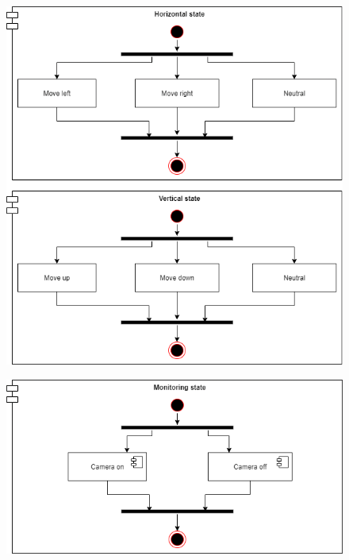 \documentclass[12pt]{article}
\begin{document}
\begin{figure}[ht]
\includegraphics[width=\textwidth,keepaspectratio]{4-VertHorz.png}
\end{figure}

\begin{figure}[ht]
\includegraphics[width=\textwidth,keepaspectratio]{5-Monitor.png}
\end{figure}
\end{document}
